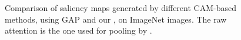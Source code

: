 \begin{figure}[H]
\begin{tabular}{ccccccccc}
    \end{tabular}
    \vspace{3pt}
    \caption{Comparison of saliency maps generated by different CAM-based methods, using GAP and our \Ours, on ImageNet images. The raw attention is the one used for pooling by \Ours.}
    \label{fig:compmethods}
    \end{figure}